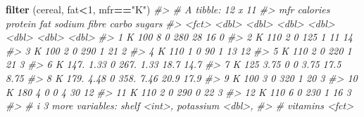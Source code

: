 \documentclass[
]{book}
\newenvironment{Shaded}{\begin{snugshade}}{\end{snugshade}}
\newcommand{\CommentTok}[1]{\textcolor[rgb]{0.56,0.35,0.01}{\textit{#1}}}
\newcommand{\DecValTok}[1]{\textcolor[rgb]{0.00,0.00,0.81}{#1}}
\newcommand{\FunctionTok}[1]{\textcolor[rgb]{0.13,0.29,0.53}{\textbf{#1}}}
\newcommand{\NormalTok}[1]{#1}
\newcommand{\SpecialCharTok}[1]{\textcolor[rgb]{0.81,0.36,0.00}{\textbf{#1}}}
\newcommand{\StringTok}[1]{\textcolor[rgb]{0.31,0.60,0.02}{#1}}
\begin{document}
\begin{Shaded}
\begin{Highlighting}[]
\FunctionTok{filter}\NormalTok{ (cereal, fat}\SpecialCharTok{\textless{}}\DecValTok{1}\NormalTok{, mfr}\SpecialCharTok{==}\StringTok{"K"}\NormalTok{)}
\CommentTok{\#\textgreater{} \# A tibble: 12 x 11}
\CommentTok{\#\textgreater{}    mfr   calories protein   fat sodium fibre carbo sugars}
\CommentTok{\#\textgreater{}    \textless{}fct\textgreater{}    \textless{}dbl\textgreater{}   \textless{}dbl\textgreater{} \textless{}dbl\textgreater{}  \textless{}dbl\textgreater{} \textless{}dbl\textgreater{} \textless{}dbl\textgreater{}  \textless{}dbl\textgreater{}}
\CommentTok{\#\textgreater{}  1 K         100     8        0   280  28     16     0   }
\CommentTok{\#\textgreater{}  2 K         110     2        0   125   1     11    14   }
\CommentTok{\#\textgreater{}  3 K         100     2        0   290   1     21     2   }
\CommentTok{\#\textgreater{}  4 K         110     1        0    90   1     13    12   }
\CommentTok{\#\textgreater{}  5 K         110     2        0   220   1     21     3   }
\CommentTok{\#\textgreater{}  6 K         147.    1.33     0   267.  1.33  18.7  14.7 }
\CommentTok{\#\textgreater{}  7 K         125     3.75     0     0   3.75  17.5   8.75}
\CommentTok{\#\textgreater{}  8 K         179.    4.48     0   358.  7.46  20.9  17.9 }
\CommentTok{\#\textgreater{}  9 K         100     3        0   320   1     20     3   }
\CommentTok{\#\textgreater{} 10 K         180     4        0     0   4     30    12   }
\CommentTok{\#\textgreater{} 11 K         110     2        0   290   0     22     3   }
\CommentTok{\#\textgreater{} 12 K         110     6        0   230   1     16     3   }
\CommentTok{\#\textgreater{} \# i 3 more variables: shelf \textless{}int\textgreater{}, potassium \textless{}dbl\textgreater{},}
\CommentTok{\#\textgreater{} \#   vitamins \textless{}fct\textgreater{}}


\end{Highlighting}
\end{Shaded}
\end{document}

